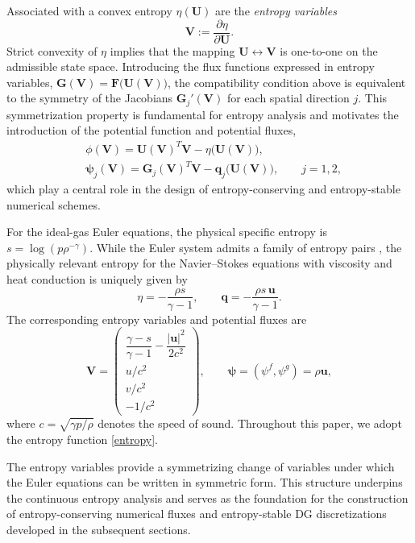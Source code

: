\documentclass[fleqn,11pt]{amsart}
\begin{document}
Associated with a convex entropy $\eta(\bm U)$ are the
\emph{entropy variables}
\begin{equation}
\bm V:=\frac{\partial\eta}{\partial\bm U}.
\end{equation}
Strict convexity of $\eta$ implies that the mapping
$\bm U\leftrightarrow\bm V$ is one-to-one on the admissible state space.
Introducing the flux functions expressed in entropy variables,
$\bm G(\bm V)=\bm F\Big(\bm U(\bm V)\Big)$, the compatibility condition above is
equivalent to the symmetry of the Jacobians $\bm G_j'(\bm V)$ for each
spatial direction $j$. This symmetrization property is fundamental for
entropy analysis and motivates the introduction of the potential
function and potential fluxes,
\begin{equation}
\begin{aligned}
&\phi(\bm V)=\bm U(\bm V)^T\bm V-\eta\Big(\bm U(\bm V)\Big),\\
&\bm\psi_j(\bm V)=\bm G_j(\bm V)^T\bm V-\bm q_j\Big(\bm U(\bm V)\Big),
\qquad j=1,2,
\end{aligned}
\end{equation}
which play a central role in the design of entropy-conserving and
entropy-stable numerical schemes.

For the ideal-gas Euler equations, the physical specific entropy is
$s=\log(p\rho^{-\gamma})$. While the Euler system admits a family of
entropy pairs \cite{Harten1983}, the physically relevant entropy for the
Navier--Stokes equations with viscosity and heat conduction is uniquely
given by \cite{Hughes1986}
\begin{equation}
\label{entropy}
\eta=-\frac{\rho s}{\gamma-1},
\qquad
\bm q=-\frac{\rho s\,\bm u}{\gamma-1}.
\end{equation}
The corresponding entropy variables and potential fluxes are
\begin{equation}
\label{entrx}
\bm V=
\begin{pmatrix}
\dfrac{\gamma-s}{\gamma-1}-\dfrac{|\bm u|^2}{2c^2}\\[0.8ex]
u/c^2\\[0.4ex]
v/c^2\\[0.4ex]
-1/c^2
\end{pmatrix},
\qquad
\bm\psi=(\psi^f,\psi^g)=\rho\bm u,
\end{equation}
where $c=\sqrt{\gamma p/\rho}$ denotes the speed of sound. Throughout
this paper, we adopt the entropy function \eqref{entropy}.

The entropy variables provide a symmetrizing change of variables under
which the Euler equations can be written in symmetric form. This
structure underpins the continuous entropy analysis and serves as the
foundation for the construction of entropy-conserving numerical fluxes
and entropy-stable DG discretizations developed in the subsequent
sections.
\end{document}
